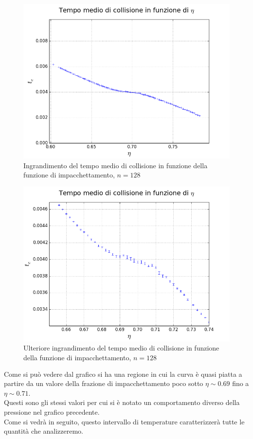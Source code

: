 \begin{figure}[h!]
	\centering
	\includegraphics[scale=0.48]{sfere2D/tczoom.png}
	\caption{Ingrandimento del tempo medio di collisione in funzione della funzione di impacchettamento, $n=128$}
	\end{figure}

\begin{figure}[h!]
	\centering
	\includegraphics[scale=0.48]{sfere2D/tczoomzoom.png}
	\caption{Ulteriore ingrandimento del tempo medio di collisione in funzione della funzione di impacchettamento, $n=128$}
	\end{figure}



Come si può vedere dal grafico si ha una regione in cui la curva è quasi piatta a partire da un valore della frazione di impacchettamento poco sotto $\eta \sim 0.69$ fino a $\eta \sim 0.71$.\\
Questi sono gli stessi valori per cui si è notato un comportamento diverso della pressione nel grafico precedente.\\
Come si vedrà in seguito, questo intervallo di temperature caratterizzerà tutte le quantità che analizzeremo.
 
